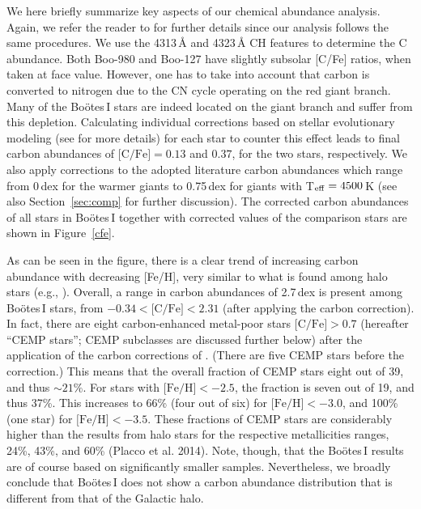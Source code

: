 \documentclass[]{emulateapj}
\begin{document}
We here briefly summarize key aspects of our chemical abundance
analysis. Again, we refer the reader to \citet{frebel14} for further
details since our analysis follows the same procedures. We use the
4313\,{\AA} and 4323\,{\AA} CH features to determine the C abundance.
Both Boo-980 and Boo-127 have slightly subsolar [C/Fe] ratios, when
taken at face value.  However, one has to take into account that
carbon is converted to nitrogen due to the CN cycle operating on the
red giant branch.  Many of the Bo\"otes\,I stars are indeed located on
the giant branch and suffer from this depletion. Calculating
individual corrections based on stellar evolutionary modeling (see
\citealt{placco14} for more details) for each star to counter this
effect leads to final carbon abundances of $\mbox{[C/Fe]}=0.13$ and
$0.37$, for the two stars, respectively.  We also apply
  corrections to the adopted literature carbon abundances which range
  from 0\,dex for the warmer giants to 0.75\,dex for giants with
  T$_{\rm eff}=4500$\,K (see also Section~\ref{sec:comp} for further
discussion).  The corrected carbon abundances of all stars in
Bo\"otes\,I together with corrected values of the comparison stars are
shown in Figure~\ref{cfe}.

As can be seen in the figure, there is a clear trend of increasing
carbon abundance with decreasing [Fe/H], very similar to what is found
among halo stars (e.g., \citealt{heresII, placco14}). Overall, a range
in carbon abundances of 2.7\,dex is present among Bo\"otes\,I stars,
from $-0.34 < \mbox{[C/Fe]}<2.31$ (after applying the carbon
correction).  In fact, there are eight carbon-enhanced metal-poor
stars $\mbox{[C/Fe]}>0.7$ (hereafter ``CEMP stars''; CEMP
subclasses are discussed further below) after the application of the
carbon corrections of \citet{placco14}. (There are five CEMP stars
before the correction.) This means that the overall fraction of CEMP
stars eight out of 39, and thus $\sim21\%$. For stars with
$\mbox{[Fe/H]}<-2.5$, the fraction is seven out of 19, and thus
37\%. This increases to 66\% (four out of six) for
$\mbox{[Fe/H]}<-3.0$, and 100\% (one star) for
$\mbox{[Fe/H]}<-3.5$. These fractions of CEMP stars are considerably
higher than the results from halo stars for the respective
metallicities ranges, 24\%, 43\%, and 60\% (Placco et al. 2014). Note,
though, that the Bo\"otes\,I results are of course based on
significantly smaller samples. Nevertheless, we broadly conclude that
Bo\"otes\,I does not show a carbon abundance distribution that is
different from that of the Galactic halo.
\end{document}
